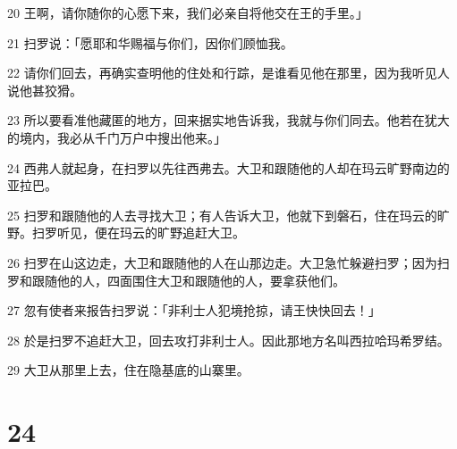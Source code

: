 \par 20 王啊，请你随你的心愿下来，我们必亲自将他交在王的手里。」
\par 21 扫罗说：「愿耶和华赐福与你们，因你们顾恤我。
\par 22 请你们回去，再确实查明他的住处和行踪，是谁看见他在那里，因为我听见人说他甚狡猾。
\par 23 所以要看准他藏匿的地方，回来据实地告诉我，我就与你们同去。他若在犹大的境内，我必从千门万户中搜出他来。」
\par 24 西弗人就起身，在扫罗以先往西弗去。大卫和跟随他的人却在玛云旷野南边的亚拉巴。
\par 25 扫罗和跟随他的人去寻找大卫；有人告诉大卫，他就下到磐石，住在玛云的旷野。扫罗听见，便在玛云的旷野追赶大卫。
\par 26 扫罗在山这边走，大卫和跟随他的人在山那边走。大卫急忙躲避扫罗；因为扫罗和跟随他的人，四面围住大卫和跟随他的人，要拿获他们。
\par 27 忽有使者来报告扫罗说：「非利士人犯境抢掠，请王快快回去！」
\par 28 於是扫罗不追赶大卫，回去攻打非利士人。因此那地方名叫西拉哈玛希罗结。
\par 29 大卫从那里上去，住在隐基底的山寨里。

\chapter{24}

